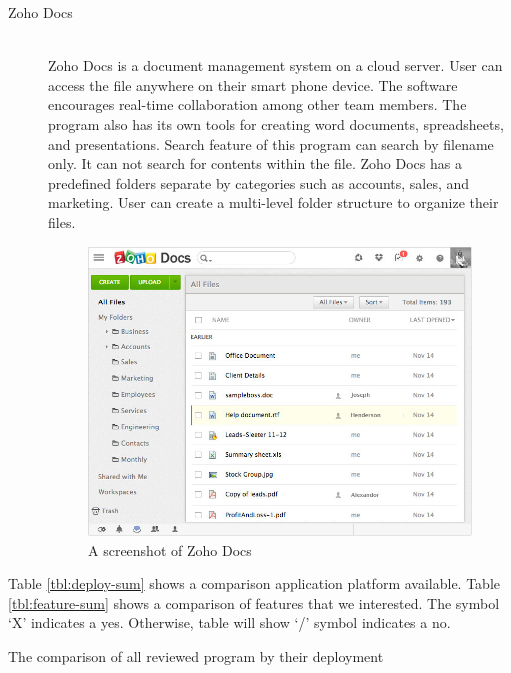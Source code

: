 \begin{description}
\item[Zoho Docs] \hfill \\
Zoho Docs is a document management system on a cloud server.
User can access the file anywhere on their smart phone device.
The software encourages real-time collaboration among other team members.
The program also has its own tools for creating word documents, spreadsheets, and presentations.
Search feature of this program can search by filename only.
It can not search for contents within the file.
Zoho Docs has a predefined folders separate by categories such as accounts, sales, and marketing.
User can create a multi-level folder structure to organize their files.
\begin{figure}[ht]
	\centering
	\includegraphics[scale=0.55]{res/literature/screenshot_zoho}
	\caption{A screenshot of Zoho Docs  \cite{zoho-doc}}
\end{figure}
\end{description}

Table \ref{tbl:deploy-sum} shows a comparison application platform available.
Table \ref{tbl:feature-sum} shows a comparison of features that we interested.
The symbol \enquote*{X} indicates a yes.
Otherwise, table will show \enquote*{/} symbol indicates a no.

\clearpage

\begin{table}
	\centering
    
    \caption{The comparison of all reviewed program by their deployment}
    \label{tbl:deploy-sum}
\end{table}

